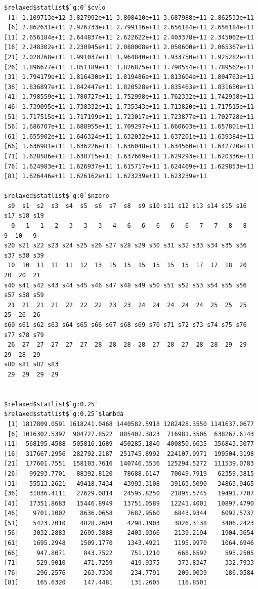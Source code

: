 \documentclass[
]{article}
\begin{document}
\begin{verbatim}
$relaxed$statlist$`g:0`$cvlo
 [1] 1.109713e+12 3.827992e+11 3.808410e+11 3.687988e+11 2.862533e+11
 [6] 2.862631e+11 2.976733e+11 2.799116e+11 2.656184e+11 2.656184e+11
[11] 2.656184e+11 2.644837e+11 2.622622e+11 2.403378e+11 2.345062e+11
[16] 2.248302e+11 2.230945e+11 2.088008e+11 2.050600e+11 2.065367e+11
[21] 2.020768e+11 1.991037e+11 1.964840e+11 1.933750e+11 1.925282e+11
[26] 1.896677e+11 1.851189e+11 1.826875e+11 1.790554e+11 1.789562e+11
[31] 1.794179e+11 1.816430e+11 1.819486e+11 1.813604e+11 1.804763e+11
[36] 1.836897e+11 1.842447e+11 1.820528e+11 1.835463e+11 1.831650e+11
[41] 1.798559e+11 1.780727e+11 1.752998e+11 1.762332e+11 1.742938e+11
[46] 1.739095e+11 1.738332e+11 1.735343e+11 1.713820e+11 1.717515e+11
[51] 1.717515e+11 1.717199e+11 1.723017e+11 1.723877e+11 1.702728e+11
[56] 1.686707e+11 1.688955e+11 1.709297e+11 1.660603e+11 1.657801e+11
[61] 1.655902e+11 1.646324e+11 1.632032e+11 1.637201e+11 1.639384e+11
[66] 1.636981e+11 1.636226e+11 1.636048e+11 1.634560e+11 1.642720e+11
[71] 1.628586e+11 1.630715e+11 1.637669e+11 1.629293e+11 1.620336e+11
[76] 1.624983e+11 1.626937e+11 1.615717e+11 1.624469e+11 1.629853e+11
[81] 1.626446e+11 1.626162e+11 1.623239e+11 1.623239e+11

$relaxed$statlist$`g:0`$nzero
 s0  s1  s2  s3  s4  s5  s6  s7  s8  s9 s10 s11 s12 s13 s14 s15 s16 s17 s18 s19 
  0   1   1   2   3   3   3   4   6   6   6   6   6   7   7   8   8   9  10   9 
s20 s21 s22 s23 s24 s25 s26 s27 s28 s29 s30 s31 s32 s33 s34 s35 s36 s37 s38 s39 
 10  10  11  11  11  12  13  15  15  15  15  15  15  17  17  18  20  20  20  21 
s40 s41 s42 s43 s44 s45 s46 s47 s48 s49 s50 s51 s52 s53 s54 s55 s56 s57 s58 s59 
 21  21  21  21  22  22  22  23  23  24  24  24  24  24  25  25  25  25  26  26 
s60 s61 s62 s63 s64 s65 s66 s67 s68 s69 s70 s71 s72 s73 s74 s75 s76 s77 s78 s79 
 26  27  27  27  27  27  28  28  28  28  27  28  27  28  28  29  29  29  28  29 
s80 s81 s82 s83 
 29  29  29  29 


$relaxed$statlist$`g:0.25`
$relaxed$statlist$`g:0.25`$lambda
 [1] 1817809.0591 1618241.0468 1440582.5918 1282428.3550 1141637.0677
 [6] 1016302.5397  904727.8522  805402.3823  716981.3506  638267.6143
[11]  568195.4588  505816.1689  450285.1840  400850.6635  356843.3077
[16]  317667.2956  282792.2187  251745.8992  224107.9971  199504.3198
[21]  177601.7551  158103.7616  140746.3536  125294.5272  111539.0783
[26]   99293.7701   88392.8120   78688.6147   70049.7919   62359.3815
[31]   55513.2621   49418.7434   43993.3108   39163.5090   34863.9465
[36]   31036.4111   27629.0814   24595.8250   21895.5745   19491.7707
[41]   17351.8683   15446.8949   13751.0589   12241.4001   10897.4790
[46]    9701.1002    8636.0658    7687.9560    6843.9344    6092.5737
[51]    5423.7010    4828.2604    4298.1903    3826.3138    3406.2423
[56]    3032.2883    2699.3888    2403.0366    2139.2194    1904.3654
[61]    1695.2948    1509.1770    1343.4921    1195.9970    1064.6946
[66]     947.8071     843.7522     751.1210     668.6592     595.2505
[71]     529.9010     471.7259     419.9375     373.8347     332.7933
[76]     296.2576     263.7330     234.7791     209.0039     186.0584
[81]     165.6320     147.4481     131.2605     116.8501


\end{verbatim}
\end{document}
